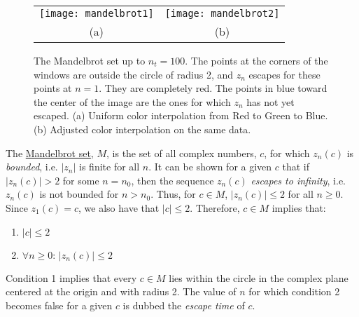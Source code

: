 \documentclass[addpoints]{exam}
\begin{document}
\begin{questions}
  \begin{figure}
    \centering
    \begin{tabular}{cc}
      \texttt{[image: mandelbrot1]}& \texttt{[image: mandelbrot2]}\\
      (a) & (b)
    \end{tabular}
    \caption{The Mandelbrot set up to $n_t = 100$. The points at the corners of the windows are outside the circle of radius 2, and $z_n$ escapes for these points at $n=1$. They are completely red. The points in blue toward the center of the image are the ones for which $z_n$ has not yet escaped. (a) Uniform color interpolation from Red to Green to Blue. (b) Adjusted color interpolation on the same data.}
    \label{fig:mandelbrot}
  \end{figure}
  
  The \href{http://en.wikipedia.org/wiki/Mandelbrot_set}{Mandelbrot set}, $M$, is the set of all complex numbers, $c$, for which $z_n(c)$ is \textit{bounded}, i.e. $|z_n|$ is finite for all $n$. It can be shown for a given $c$ that if $|z_{n}(c)| > 2$ for some $n = n_0$, then the sequence $z_n(c)$ {\it escapes to infinity}, i.e. $z_n(c)$ is not bounded for $n > n_0$. Thus, for $c\in M$, $|z_n(c)| \leq 2$ for all $n\geq 0$. Since $z_1(c) = c$, we also have that $|c| \leq 2$. Therefore, $c\in M$ implies that:
  \begin{enumerate}
  \item $|c|\leq 2$
  \item $\forall n\geq 0:\, |z_n(c)|\leq 2$
  \end{enumerate}
  Condition 1 implies that every $c\in M$ lies within the circle in the complex plane centered at the origin and with radius 2. The value of $n$ for which condition 2 becomes false for a given $c$ is dubbed the {\it escape time} of $c$.


\end{questions}
\end{document}
